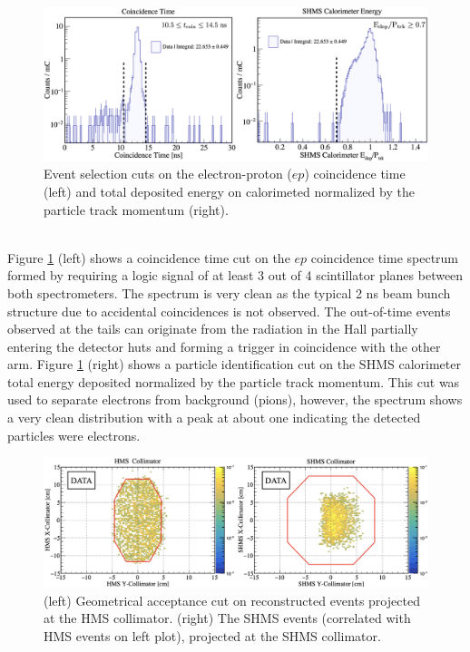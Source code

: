 \documentclass[aps, prl]{revtex4-2}  %
\providecommand{\DIFaddbeginFL}{} %
\providecommand{\DIFaddendFL}{} %
\providecommand{\DIFdelbeginFL}{} %
\providecommand{\DIFdelendFL}{} %
\newcommand{\DIFscaledelfig}{0.5}
\newlength{\DIFdelgraphicswidth} %
\newlength{\DIFdelgraphicsheight} %
\newcommand{\DIFaddincludegraphics}[2][]{{\color{blue}\fbox{\DIFOincludegraphics[#1]{#2}}}} %
\newcommand{\DIFdelincludegraphics}[2][]{%
\sbox{\DIFdelgraphicsbox}{\DIFOincludegraphics[#1]{#2}}%
\settoboxwidth{\DIFdelgraphicswidth}{\DIFdelgraphicsbox} %
\settoboxtotalheight{\DIFdelgraphicsheight}{\DIFdelgraphicsbox} %
\scalebox{\DIFscaledelfig}{%
\parbox[b]{\DIFdelgraphicswidth}{\usebox{\DIFdelgraphicsbox}\\[-\baselineskip] \rule{\DIFdelgraphicswidth}{0em}}\llap{\resizebox{\DIFdelgraphicswidth}{\DIFdelgraphicsheight}{%
\setlength{\unitlength}{\DIFdelgraphicswidth}%
\begin{picture}(1,1)%
\thicklines\linethickness{2pt} %
{\color[rgb]{1,0,0}\put(0,0){\framebox(1,1){}}}%
{\color[rgb]{1,0,0}\put(0,0){\line( 1,1){1}}}%
{\color[rgb]{1,0,0}\put(0,1){\line(1,-1){1}}}%
\end{picture}%
}\hspace*{3pt}}} %
} %
\DeclareRobustCommand{\DIFaddbeginFL}{\DIFOaddbeginFL \let\includegraphics\DIFaddincludegraphics} %
\DeclareRobustCommand{\DIFaddendFL}{\DIFOaddendFL \let\includegraphics\DIFOincludegraphics} %
\DeclareRobustCommand{\DIFdelbeginFL}{\DIFOdelbeginFL \let\includegraphics\DIFdelincludegraphics} %
\DeclareRobustCommand{\DIFdelendFL}{\DIFOaddendFL \let\includegraphics\DIFOincludegraphics} %
\begin{document}
\begin{figure}[!h]
\DIFdelbeginFL %
\DIFdelendFL \DIFaddbeginFL \includegraphics[scale=0.22]{plots/coin_and_eCal_CUT_80MeV_35deg.png}
\DIFaddendFL \caption{Event selection cuts on the electron-proton ($ep$) coincidence time (left) and total deposited energy on calorimeted normalized by the particle track momentum (right).}
\label{fig:coin_ecal_cuts}
\end{figure}\\
\indent Figure \ref{fig:coin_ecal_cuts} (left) shows a coincidence time cut on the $ep$ coincidence time spectrum formed by requiring a logic signal of
at least 3 out of 4 scintillator planes between both spectrometers. The spectrum is very clean as the typical 2 ns beam bunch structure due to accidental
coincidences is not observed. The out-of-time events observed at the tails can originate from the radiation in the Hall partially entering the detector huts and forming
a trigger in coincidence with the other arm. Figure \ref{fig:coin_ecal_cuts} (right) shows a particle identification cut on the SHMS calorimeter total energy
deposited normalized by the particle track momentum. This cut was used to separate electrons from background (pions), however, the spectrum shows a very clean distribution
with a peak at about one indicating the detected particles were electrons.
\begin{figure}[!h]
\DIFdelbeginFL %
\DIFdelendFL \DIFaddbeginFL \includegraphics[scale=0.22]{plots/collimator_CUT_80MeV_35deg_data.png}
\DIFaddendFL \caption{(left) Geometrical acceptance cut on reconstructed events projected at the HMS collimator. (right) The SHMS events (correlated with HMS events on left plot),
  projected at the SHMS collimator.}
\label{fig:data_coll_cuts}
\end{figure}
\end{document}
